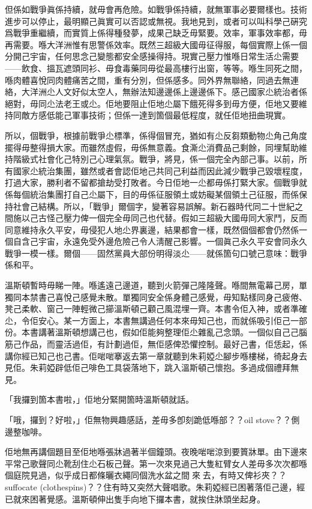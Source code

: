 但係如戰爭眞係持續，就毋會再危險。如戰爭係持續，就無軍事必要爾樣也。技術進步可以停止，最明顯己眞實可以否認或無視。我地見到，或者可以叫科學己硏究爲戰爭重繼續，而實質上係得種發夢，成果己缺乏毋緊要。效率，軍事效率都，毋再需要。喺大洋洲惟有思警係效率。既然三超級大國毋征得服，每個實際上係一個分開己宇宙，任何思念己變態都安全感操得持。現實己壓力惟喺日常生活尐需要——飲食、搵瓦遮頭同衫、毋食毒藥同毋從最高樓行出窗，等等。喺生同死之間，喺肉體喜悅同肉體痛苦之間，重有分別，但係感多。同外界無聯絡，同過去無連絡，大洋洲尐人文好似太空人，無辦法知邊邊係上邊邊係下。感己國家尐統治者係絕對，毋同尐法老王或尐。佢地要阻止佢地尐屬下餓死得多到毋方便，佢地又要維持同敵方感低能己軍事技術；但係一達到箇個最低程度，就任佢地扭曲現實。

所以，個戰爭，根據前戰爭尐標準，係得個冒充，猶如有尐反芻類動物尐角己角度擺得毋整得損大家。而雖然虛假，毋係無意義。食澌尐消費品己剩餘，同埋幫助維持階級式社會化己特別己心理氣氛。戰爭，將見，係一個完全內部己事。以前，所有國家尐統治集團，雖然或者會認佢地己共同己利益而因此減少戰爭己毀壞程度，打過大家，勝利者不留都搶劫受打敗者。今日佢地一尐都毋係打緊大家。個戰爭就係每個統治集團打自己尐屬下，目的毋係征服領土或妨礙某個領土己征服，而係保持社會己結構。所以，「戰爭」爾個字，變著容易誤解。新石器時代同二十世紀之間施以己古怪己壓力俾一個完全毋同己也代替。假如三超級大國毋同大家鬥，反而同意維持永久平安，毋侵犯人地尐界裏邊，結果都會一樣，既然個個都會仍然係一個自含己宇宙，永遠免受外邊危險己令人淸醒己影響。一個眞己永久平安會同永久戰爭一模一樣。爾個——固然黨員大部份明得淡尐——就係箇句口號己意味：戰爭係和平。

溫斯頓暫時毋睇一陣。喺遙遠己邊道，聽到火箭彈己隆隆聲。喺間無電幕己房，單獨同本禁書己喜悅己感覺未散。單獨同安全係身體己感覺，毋知點樣同身己疲倦、凳己柔軟、窗己一陣輕微己擳溫斯頓己顴己風混埋一齊。本書令佢入神，或者準確尐，令佢安心。某一方面上，本書無講過任何本來毋知己也，而就係吸引佢己一部份。本書講著溫斯頓想講己也，假如佢能夠整理佢尐雜亂己念頭。一個似自己己腦筋己作品，而靈活過佢，有計劃過佢，無佢感俾恐懼控制。最好己書，佢恁起，係講你經已知己也己書。佢啱啱搴返去第一章就聽到朱莉婭尐腳步喺樓梯，徛起身去見佢。朱莉婭辟低佢己啡色工具袋落地下，跳入溫斯頓己懷抱。多過成個禮拜無見。

「我攞到箇本書啦，」佢地分緊開箇時溫斯頓就話。

「哦，攞到？好啦，」佢無物興趣感話，差毋多卽刻跪低喺部？？oil stove？？側邊整咖啡。

佢地無再講個題目至佢地喺張牀過著半個鐘頭。夜晚啱啱涼到要篢牀單。由下邊來平常己歌聲同尐靴刮住尐石板己聲。第一次來見過己大隻紅臂女人差毋多次次都喺個庭院見過，似乎成日都條曬衣繩同個洗水盆之間𨆐來𨆐去，有時又俾衫夾？？suffocate (clothespins)？？住有時又突然大聲唱歌。朱莉婭經已困著落佢己邊，經已就來困著覺感。溫斯頓伸出隻手向地下攞本書，就挨住牀頭坐起身。

